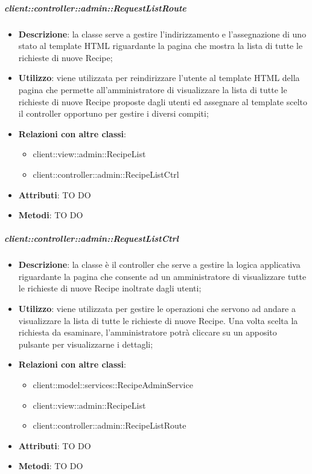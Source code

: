 		\subparagraph{client::controller::admin::RequestListRoute} %
		\label{subp:bdsm_app_client_controller_admin_recipelistroute}
			\begin{itemize}
				\item \textbf{Descrizione}: la classe serve a gestire l'indirizzamento e l'assegnazione di uno stato al template HTML riguardante la pagina che mostra la lista di tutte le richieste di nuove Recipe;
				\item \textbf{Utilizzo}: viene utilizzata per reindirizzare l'utente al template HTML della pagina che permette all'amministratore di visualizzare la lista di tutte le richieste di nuove Recipe proposte dagli utenti ed assegnare al template scelto il controller opportuno per gestire i diversi compiti;
				\item \textbf{Relazioni con altre classi}:
					\begin{itemize}
						\item client::view::admin::RecipeList
						\item client::controller::admin::RecipeListCtrl
					\end{itemize}
				\item \textbf{Attributi}: TO DO
				\item \textbf{Metodi}: TO DO
			\end{itemize}

		\subparagraph{client::controller::admin::RequestListCtrl} %
		\label{subp:bdsm_app_client_controller_admin_requestlistctrl}
			\begin{itemize}
				\item \textbf{Descrizione}: la classe è il controller che serve a gestire la logica applicativa riguardante la pagina che consente ad un amministratore di visualizzare tutte le richieste di nuove Recipe inoltrate dagli utenti;
				\item \textbf{Utilizzo}: viene utilizzata per gestire le operazioni che servono ad andare a visualizzare la lista di tutte le richieste di nuove Recipe. Una volta scelta la richiesta da esaminare, l'amministratore potrà cliccare su un apposito pulsante per visualizzarne i dettagli;
				\item \textbf{Relazioni con altre classi}:
					\begin{itemize}
						\item client::model::services::RecipeAdminService
						\item client::view::admin::RecipeList
						\item client::controller::admin::RecipeListRoute
					\end{itemize}
				\item \textbf{Attributi}: TO DO
				\item \textbf{Metodi}: TO DO
			\end{itemize}

